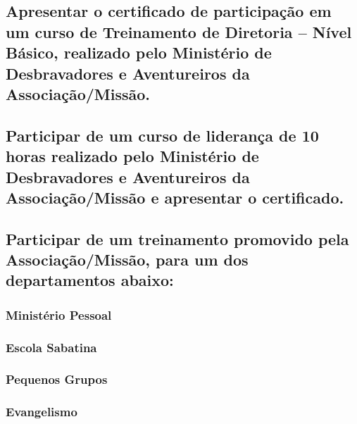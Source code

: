 \subsection{Apresentar o certificado de participação em um curso de Treinamento de Diretoria -- Nível Básico, realizado pelo Ministério de Desbravadores e Aventureiros da Associação/Missão.}

\subsection{Participar de um curso de liderança de 10 horas realizado pelo Ministério de Desbravadores e Aventureiros da Associação/Missão e apresentar o certificado.}

\subsection{Participar de um treinamento promovido pela Associação/Missão, para um dos departamentos abaixo:}

\subsubsection{Ministério Pessoal}
\subsubsection{Escola Sabatina}
\subsubsection{Pequenos Grupos}
\subsubsection{Evangelismo}